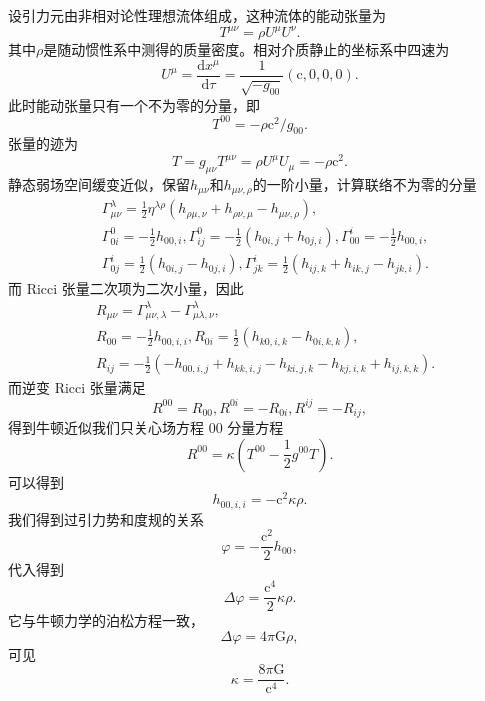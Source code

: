\documentclass[11pt, a4paper, oneside, onecolumn]{ctexart}
\numberwithin{equation}{subsection}
\begin{document}
设引力元由非相对论性理想流体组成，这种流体的能动张量为
\begin{equation}
T^{\mu\nu}=\rho U^{\mu}U^{\nu}.
\end{equation}
其中$\rho$是随动惯性系中测得的质量密度。相对介质静止的坐标系中四速为
\begin{equation}
U^{\mu}=\frac{\mathrm{d}x^{\mu}}{\mathrm{d}\tau}=\frac{1}{\sqrt{-g_{00}}}\left(\mathrm{c},0,0,0\right).
\end{equation}
此时能动张量只有一个不为零的分量，即
\begin{equation}
T^{00}=-\rho\mathrm{c}^{2}/g_{00}.
\end{equation}
张量的迹为
\begin{equation}
T=g_{\mu\nu}T^{\mu\nu}=\rho U^{\mu}U_{\mu}=-\rho\mathrm{c}^{2}.
\end{equation}
静态弱场空间缓变近似，保留$h_{\mu\nu}$和$h_{\mu\nu,\rho}$的一阶小量，计算联络不为零的分量
\begin{align}
&\Gamma_{\mu\nu}^{\lambda}=\frac12\eta^{\lambda\rho}\left(h_{\rho\mu,\nu}+h_{\rho\nu,\mu}-h_{\mu\nu,\rho}\right),\\
&\Gamma_{0i}^{0}=-\frac12h_{00,i},\Gamma_{ij}^{0}=-\frac12\left(h_{0i,j}+h_{0j,i}\right),\Gamma_{00}^{i}=-\frac12h_{00,i},\\
&\Gamma_{0j}^{i}=\frac12\left(h_{0i,j}-h_{0j,i}\right),\Gamma_{jk}^{i}=\frac12\left(h_{ij,k}+h_{ik,j}-h_{jk,i}\right).
\end{align}
而 Ricci 张量二次项为二次小量，因此
\begin{align}
&R_{\mu\nu}=\Gamma_{\mu\nu,\lambda}^{\lambda}-\Gamma_{\mu\lambda,\nu}^{\lambda},\\
&R_{00}=-\frac12h_{00,i,i},R_{0i}=\frac12\left(h_{k0,i,k}-h_{0i,k,k}\right),\\
&R_{ij}=-\frac12\left(-h_{00,i,j}+h_{kk,i,j}-h_{ki,j,k}-h_{kj,i,k}+h_{ij,k,k}\right).
\end{align}
而逆变 Ricci 张量满足
\begin{equation}
R^{00}=R_{00},R^{0i}=-R_{0i},R^{ij}=-R_{ij},
\end{equation}
得到牛顿近似我们只关心场方程 00 分量方程
\begin{equation}
R^{00}=\kappa\left(T^{00}-\frac12g^{00}T\right).
\end{equation}
可以得到
\begin{equation}
h_{00,i,i}=-\mathrm{c}^{2}\kappa\rho.
\end{equation}
我们得到过引力势和度规的关系
\begin{equation}
\varphi=-\frac{\mathrm{c}^{2}}{2}h_{00},
\end{equation}
代入得到
\begin{equation}
\Delta{}\varphi=\frac{\mathrm{c}^{4}}{2}\kappa\rho.
\end{equation}
它与牛顿力学的泊松方程一致，
\begin{equation}
\Delta{}\varphi=4\pi\mathrm{G}\rho,
\end{equation}
可见
\begin{equation}
\kappa=\frac{8\pi\mathrm{G}}{\mathrm{c}^{4}}.
\end{equation}
\end{document}
